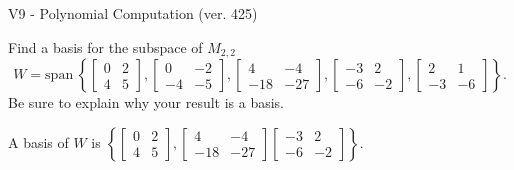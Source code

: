 \begin{exercise}
  \begin{exerciseTitle}V9 - Polynomial Computation (ver. 425)\end{exerciseTitle}
  \begin{exerciseStatement}
    Find a basis for the subspace of \(M_{2,2}\) 
\[W=\mathrm{span}\ \left\{\left[\begin{array}{cc}
0 & 2 \\
4 & 5
\end{array}\right] , \left[\begin{array}{cc}
0 & -2 \\
-4 & -5
\end{array}\right] , \left[\begin{array}{cc}
4 & -4 \\
-18 & -27
\end{array}\right] , \left[\begin{array}{cc}
-3 & 2 \\
-6 & -2
\end{array}\right] , \left[\begin{array}{cc}
2 & 1 \\
-3 & -6
\end{array}\right]\right\}.\]
 Be sure to explain why your result is a basis.


  \end{exerciseStatement}
  \begin{exerciseAnswer}
   A basis of \(W\) is  \(\left\{\left[\begin{array}{cc}
0 & 2 \\
4 & 5
\end{array}\right] , \left[\begin{array}{cc}
4 & -4 \\
-18 & -27
\end{array}\right] \left[\begin{array}{cc}
-3 & 2 \\
-6 & -2
\end{array}\right]\right\}\).
  


  \end{exerciseAnswer}
\end{exercise}